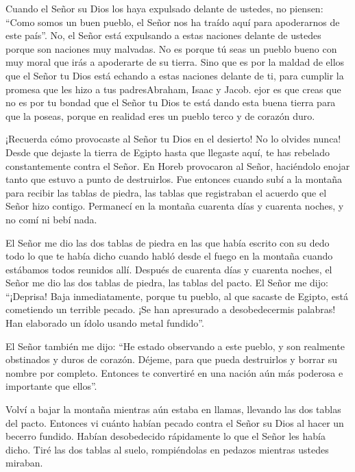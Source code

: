  Cuando el Señor su Dios los haya expulsado delante de
ustedes, no piensen: ``Como somos un buen pueblo, el Señor nos ha traído
aquí para apoderarnos de este país''. No, el Señor está expulsando a
estas naciones delante de ustedes porque son naciones muy malvadas.
 No es porque tú seas un pueblo bueno con muy moral que irás
a apoderarte de su tierra. Sino que es por la maldad de ellos que el
Señor tu Dios está echando a estas naciones delante de ti, para cumplir
la promesa que les hizo a tus padresAbraham, Isaac y Jacob. 
ejor es que creas que no es por tu bondad que el Señor tu Dios te está
dando esta buena tierra para que la poseas, porque en realidad eres un
pueblo terco y de corazón duro.

 ¡Recuerda cómo provocaste al Señor tu Dios en el desierto!
No lo olvides nunca! Desde que dejaste la tierra de Egipto hasta que
llegaste aquí, te has rebelado constantemente contra el Señor.
 En Horeb provocaron al Señor, haciéndolo enojar tanto que
estuvo a punto de destruirlos.  Fue entonces cuando subí a
la montaña para recibir las tablas de piedra, las tablas que registraban
el acuerdo que el Señor hizo contigo. Permanecí en la montaña cuarenta
días y cuarenta noches, y no comí ni bebí nada.

 El Señor me dio las dos tablas de piedra en las que había
escrito con su dedo todo lo que te había dicho cuando habló desde el
fuego en la montaña cuando estábamos todos reunidos allí. 
Después de cuarenta días y cuarenta noches, el Señor me dio las dos
tablas de piedra, las tablas del pacto.  El Señor me dijo:
``¡Deprisa! Baja inmediatamente, porque tu pueblo, al que sacaste de
Egipto, está cometiendo un terrible pecado. ¡Se han apresurado a
desobedecermis palabras! Han elaborado un ídolo usando metal fundido''.

 El Señor también me dijo: ``He estado observando a este
pueblo, y son realmente obstinados y duros de corazón. 
Déjeme, para que pueda destruirlos y borrar su nombre por completo.
Entonces te convertiré en una nación aún más poderosa e importante que
ellos''.

 Volví a bajar la montaña mientras aún estaba en llamas,
llevando las dos tablas del pacto.  Entonces vi cuánto
habían pecado contra el Señor su Dios al hacer un becerro fundido.
Habían desobedecido rápidamente lo que el Señor les había dicho.
 Tiré las dos tablas al suelo, rompiéndolas en pedazos
mientras ustedes miraban.

